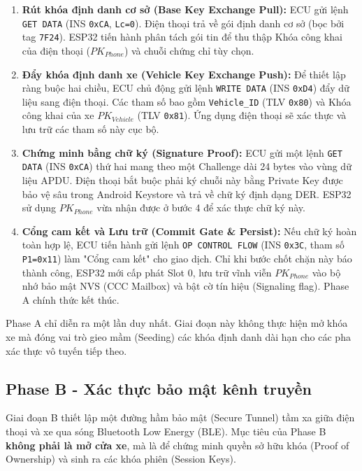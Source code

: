 \begin{enumerate}
    \item \textbf{Rút khóa định danh cơ sở (Base Key Exchange Pull):} 
    ECU gửi lệnh \texttt{GET DATA} (INS \texttt{0xCA}, \texttt{Lc=0}). Điện thoại trả về gói định danh cơ sở (bọc bởi tag \texttt{7F24}). ESP32 tiến hành phân tách gói tin để thu thập Khóa công khai của điện thoại ($PK_{Phone}$) và chuỗi chứng chỉ tùy chọn.

    \item \textbf{Đẩy khóa định danh xe (Vehicle Key Exchange Push):} 
    Để thiết lập ràng buộc hai chiều, ECU chủ động gửi lệnh \texttt{WRITE DATA} (INS \texttt{0xD4}) đẩy dữ liệu sang điện thoại. Các tham số bao gồm \texttt{Vehicle\_ID} (TLV \texttt{0x80}) và Khóa công khai của xe $PK_{Vehicle}$ (TLV \texttt{0x81}). Ứng dụng điện thoại sẽ xác thực và lưu trữ các tham số này cục bộ.

    \item \textbf{Chứng minh bằng chữ ký (Signature Proof):} 
    ECU gửi một lệnh \texttt{GET DATA} (INS \texttt{0xCA}) thứ hai mang theo một Challenge dài 24 bytes vào vùng dữ liệu APDU. Điện thoại bắt buộc phải ký chuỗi này bằng Private Key được bảo vệ sâu trong Android Keystore và trả về chữ ký định dạng DER. ESP32 sử dụng $PK_{Phone}$ vừa nhận được ở bước 4 để xác thực chữ ký này.

    \item \textbf{Cổng cam kết và Lưu trữ (Commit Gate \& Persist):} 
    Nếu chữ ký hoàn toàn hợp lệ, ECU tiến hành gửi lệnh \texttt{OP CONTROL FLOW} (INS \texttt{0x3C}, tham số \texttt{P1=0x11}) làm "Cổng cam kết" cho giao dịch. Chỉ khi bước chốt chặn này báo thành công, ESP32 mới cấp phát Slot 0, lưu trữ vĩnh viễn $PK_{Phone}$ vào bộ nhớ bảo mật NVS (CCC Mailbox) và bật cờ tín hiệu (Signaling flag). Phase A chính thức kết thúc.
\end{enumerate}

Phase A chỉ diễn ra một lần duy nhất. Giai đoạn này không thực hiện mở khóa xe mà đóng vai trò gieo mầm (Seeding) các khóa định danh dài hạn cho các pha xác thực vô tuyến tiếp theo.

\subsection{Phase B - Xác thực bảo mật kênh truyền}
Giai đoạn B thiết lập một đường hầm bảo mật (Secure Tunnel) tầm xa giữa điện thoại và xe qua sóng Bluetooth Low Energy (BLE). Mục tiêu của Phase B \textbf{không phải là mở cửa xe}, mà là để chứng minh quyền sở hữu khóa (Proof of Ownership) và sinh ra các khóa phiên (Session Keys).

